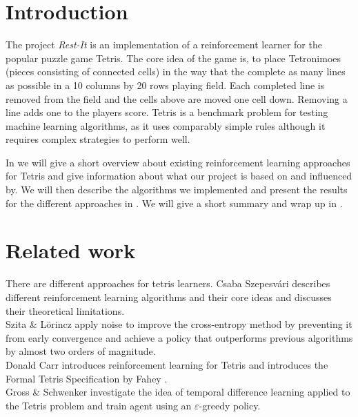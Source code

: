 \documentclass{ml}
\begin{document}


\section{Introduction}
\label{intro}
The project \textit{Rest-It} is an implementation of a reinforcement learner for the popular puzzle game Tetris. 
The core idea of the game is, to place Tetronimoes (pieces consisting of connected cells) in the way that the complete as many lines as possible in a 10 columns by 20 rows playing field.
Each completed line is removed from the field and the cells above are moved one cell down.
Removing a line adds one to the players score.
Tetris is a benchmark problem for testing machine learning algorithms, as it uses comparably simple rules although it requires complex strategies to perform well. 

In  we will give a short overview about existing reinforcement learning approaches for Tetris and give information about what our project is based on and influenced by.
We will then describe the algorithms we implemented  and present  the results for the different approaches in .
We will give a short summary and wrap up in .


\section{Related work}
\label{relatedwork}
There are different approaches for tetris learners. 
Csaba Szepesvári \cite{szepesvari2010algorithms} describes different reinforcement learning algorithms and their core ideas and discusses their theoretical  limitations. \\
Szita \&  L{\"o}rincz \cite{szita2006learning} apply noise to improve the cross-entropy method by preventing it from early convergence and achieve a policy that outperforms previous algorithms by almost two orders of magnitude.\\
Donald Carr introduces reinforcement learning for Tetris and introduces the Formal Tetris Specification by Fahey \cite{faheytetris}.\\
Gross \& Schwenker \cite{gross2008learningto} investigate the idea of temporal difference learning applied to the Tetris problem and train agent using an $\varepsilon$-greedy policy. 
\end{document}
